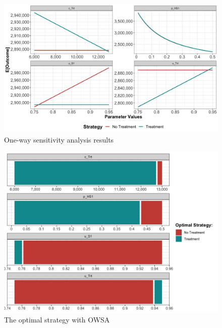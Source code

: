 \documentclass[]{book}
\begin{document}
\begin{figure}

{\centering \includegraphics[width=1\linewidth]{../figs/05a_owsa_nmb} 

}

\caption{One-way sensitivity analysis results}\label{fig:05a-owsa-nmb}
\end{figure}

\begin{figure}

{\centering \includegraphics[width=1\linewidth]{../figs/05a_optimal_owsa_nmb} 

}

\caption{The optimal strategy with OWSA}\label{fig:05a-optimal-owsa-nmb}
\end{figure}
\end{document}
